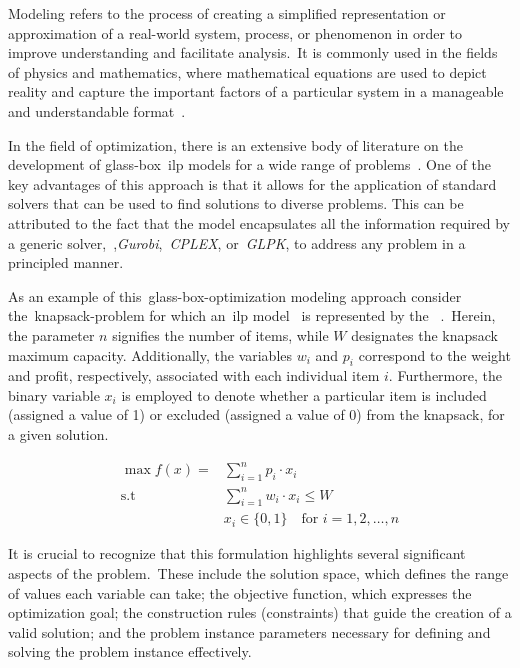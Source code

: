 Modeling refers to the process of creating a simplified representation or
approximation of a real-world system, process, or phenomenon in order to improve
understanding and facilitate analysis.~It is commonly used in the fields of
physics and mathematics, where mathematical equations are used to depict reality
and capture the important factors of a particular system in a manageable and
understandable format~\cite{witelski2015methods}.

In the field of optimization, there is an extensive body of literature on the
development of glass-box~\acrshort{ilp} models for a wide range of
problems~\cite{papadimitriou1998combinatorial,nocedal2006numerical,williamson2011design}.
One of the key advantages of this approach is that it allows for the application
of standard solvers that can be used to find solutions to diverse problems. This
can be attributed to the fact that the model encapsulates all the information
required by a generic solver,~\eg{},\textit{Gurobi},~\textit{CPLEX},
or~\textit{GLPK}, to address any problem in a principled manner.

As an example of this~\acrshort{glass-box-optimization} modeling approach
consider the~\acrshort{knapsack-problem} for which an~\acrshort{ilp}
model~\cite{yu2010combinatorial} is represented by the
~.~Herein, the parameter $n$ signifies the number
of items, while $W$ designates the knapsack maximum capacity. Additionally,
the variables $w_{i}$ and $p_{i}$ correspond to the weight and profit,
respectively, associated with each individual item $i$. Furthermore, the binary
variable $x_{i}$ is employed to denote whether a particular item is included
(assigned a value of 1) or excluded (assigned a value of 0) from the knapsack,
for a given solution.

\begin{equation}
  \label{eq:knapsack-ilp}
  \begin{aligned}
    \max f(x) = & \sum_{i=1}^{n} p_i \cdot x_i                           \\
    \text{s.t } & \sum_{i=1}^{n} w_i \cdot x_i \leq W                    \\
                & x_i \in \{0, 1\} \quad \text{for } i = 1, 2, \ldots, n
  \end{aligned}
\end{equation}

It is crucial to recognize that this formulation highlights several significant
aspects of the problem.~These include the solution space, which defines the
range of values each variable can take; the objective function, which expresses
the optimization goal; the construction rules (constraints) that guide the
creation of a valid solution; and the problem instance parameters necessary for
defining and solving the problem instance effectively.


